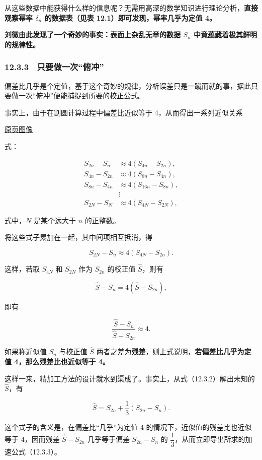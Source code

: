 \documentclass[
  10pt,
  fontset=fandol]{ctexart}
\begin{document}
\endgroup

从这些数据中能获得什么样的信息呢？无需用高深的数学知识进行理论分析，\textbf{直接观察幂率 \(\delta_n\) 的数据表（见表 12.1）即可发现，幂率几乎为定值 4。}

\textbf{刘徽由此发现了一个奇妙的事实：表面上杂乱无章的数据 \(S_n\) 中竟蕴藏着极其鲜明的规律性。}

\subsubsection{12.3.3　只要做一次``俯冲''}\label{ux53eaux8981ux505aux4e00ux6b21ux4fefux51b2}

偏差比几乎是个定值，基于这个奇妙的规律，分析误差只是一蹴而就的事，据此只要做一次``俯冲''便能捕捉到所要的校正公式。

事实上，由于在割圆计算过程中偏差比近似等于 4，从而得出一系列近似关系

\href{../../source-images/pdf-300.jpeg}{原页图像}

式：

\[
\begin{aligned}
S_{2n}-S_n&\approx4(S_{4n}-S_{2n}),\\
S_{4n}-S_{2n}&\approx4(S_{8n}-S_{4n}),\\
S_{8n}-S_{4n}&\approx4(S_{16n}-S_{8n}),\\
&\vdots\\
S_{2N}-S_N&\approx4(S_{4N}-S_{2N}),
\end{aligned}
\]

式中，\(N\) 是某个远大于 \(n\) 的正整数。

将这些式子累加在一起，其中间项相互抵消，得

\[
S_{2N}-S_n\approx4(S_{4N}-S_{2n}).
\]

这样，若取 \(S_{4N}\) 和 \(S_{2N}\) 作为 \(S_{2n}\) 的校正值 \(\widehat S\)，则有

\[
\widehat S-S_n=4(\widehat S-S_{2n}),
\tag{12.3.2}
\]

即有

\[
\frac{\widehat S-S_n}{\widehat S-S_{2n}}\approx4.
\]

如果称近似值 \(S_n\) 与校正值 \(\widehat S\) 两者之差为\textbf{残差}，则上式说明，\textbf{若偏差比几乎为定值 4，那么残差比也近似等于 4。}

这样一来，精加工方法的设计就水到渠成了。事实上，从式（12.3.2）解出未知的 \(\widehat S\)，有

\[
\widehat S=S_{2n}+\frac{1}{3}(S_{2n}-S_n).
\tag{12.3.3}
\]

这个式子的含义是，在偏差比``几乎''为定值 4 的情况下，近似值的残差比也近似等于 4，因而残差 \(\widehat S-S_{2n}\) 几乎等于偏差 \(S_{2n}-S_n\) 的 \(\dfrac13\)，从而立即导出所求的加速公式（12.3.3）。
\end{document}
